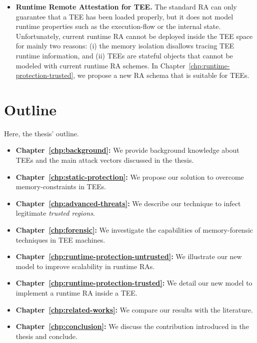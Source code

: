 \begin{itemize}
	\item[\circledrA{5}]
	\textbf{Runtime Remote Attestation for TEE.} 
	The standard RA can only guarantee that a TEE has been 
	loaded properly, but it does not model runtime properties such as the 
	execution-flow or the internal state.
	Unfortunately, current runtime RA cannot be deployed inside the TEE space
	for mainly two reasons: (i) the memory isolation disallows tracing TEE
	runtime information, and (ii) TEEs are stateful objects that cannot be 
	modeled with current runtime RA schemes.
	In Chapter~\ref{chp:runtime-protection-trusted}, we propose a new RA schema 
	that is suitable for TEEs.
	
\end{itemize}

\section{Outline}
\label{sec:outline}

Here, the thesis' outline.

\begin{itemize}[label={}]
	\item \textbf{Chapter~\ref{chp:background}:} We provide background 
	knowledge about TEEs and the main attack vectors discussed in the thesis.
	\item \textbf{Chapter~\ref{chp:static-protection}:} We propose our solution 
	to overcome memory-constraints in TEEs.
	\item \textbf{Chapter~\ref{chp:advanced-threats}:} We describe our 
	technique to infect legitimate \emph{trusted regions}.
	\item \textbf{Chapter~\ref{chp:forensic}:} We investigate the capabilities 
	of 	memory-forensic techniques in TEE machines.
	\item \textbf{Chapter~\ref{chp:runtime-protection-untrusted}:} We 
	illustrate our new model to improve scalability in runtime RAs.
	\item \textbf{Chapter~\ref{chp:runtime-protection-trusted}:} We detail our 
	new model to implement a runtime RA inside a TEE.
	\item \textbf{Chapter~\ref{chp:related-works}:} We compare our results 
	with the literature.
	\item \textbf{Chapter~\ref{chp:conclusion}:} We discuss the contribution 
	introduced in the thesis and conclude.
\end{itemize}

